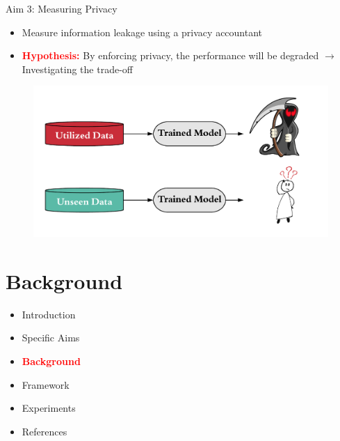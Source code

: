 \documentclass{beamer}
\begin{document}
\begin{frame}{Aim 3: Measuring Privacy}

\begin{itemize}
  \item Measure information leakage using a privacy accountant
  
  \item \textbf{\textcolor{red}{Hypothesis:}} By enforcing privacy, the performance will be degraded $\rightarrow$ Investigating the trade-off

\end{itemize}

\begin{center}
  \begin{figure}
\includegraphics[scale=0.15]{_img/privacyhyp.png}
\end{figure}\label{fig:privacyhyp}
\vskip 1cm
\end{center}


\end{frame}


\section{Background}

\begin{frame}{}
\begin{itemize}
  \item Introduction
  \item Specific Aims
  \item \textcolor{red}{\textbf{Background}}
  \item Framework
  \item Experiments
  \item References
  
\end{itemize}
\end{frame}
\end{document}
